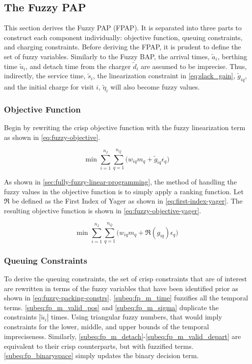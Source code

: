 \documentclass[ee,msthesis]{usuthesis}
\begin{document}
\subsection{The Fuzzy PAP}
\label{sec:the-fuzzy-pap}
This section derives the Fuzzy PAP (FPAP). It is separated into three parts to construct each component individually:
objective function, queuing constraints, and charging constraints. Before deriving the FPAP, it is prudent to define the
set of fuzzy variables. Similarly to the Fuzzy BAP, the arrival times, \(\tilde{a}_i\), berthing time \(\tilde{u}_i\), and
detach time from the charger \(\tilde{d}_i\) are assumed to be imprecise. Thus, indirectly, the service time,
\(\tilde{s}_i\), the linearization constraint in \ref{eq:slack_gain}, \(\tilde{g}_{iq}\), and the initial charge for visit
\(i\), \(\tilde{\eta}_i\) will also become fuzzy values.

\subsubsection{Objective Function}
\label{sec:orgd519e21}
Begin by rewriting the crisp objective function with the fuzzy linearization term as shown in \ref{eq:fuzzy-objective}.

\begin{equation}
\label{eq:fuzzy-objective}
\text{min } \sum_{i=1}^{n_I} \sum_{q=1}^{n_Q} \Big( w_{iq} m_q + \tilde{g}_{iq} \epsilon_{q} \Big)
\end{equation}

As shown in \ref{sec:fully-fuzzy-linear-programming}, the method of handling the fuzzy values in the objective function is to
simply apply a ranking function. Let \(\mathfrak{R}\) be defined as the First Index of Yager as shown in \ref{eq:first-index-yager}.
The resulting objective function is shown in \ref{eq:fuzzy-objective-yager}.

\begin{equation}
\label{eq:fuzzy-objective-yager}
\text{min } \sum_{i=1}^{n_I} \sum_{q=1}^{n_Q} \Big( w_{iq} m_q + \mathfrak{R}(g_{iq}) \epsilon_{q} \Big)
\end{equation}

\subsubsection{Queuing Constraints}
\label{sec:orge82956f}
To derive the queuing constraints, the set of crisp constraints that are of interest are rewritten in terms of the fuzzy
variables that have been identified prior as shown in \ref{eq:fuzzy-packing-constrs}. \ref{subeq:fp_m_time} fuzzifies all the
temporal terms. \ref{subeq:fp_m_valid_pos} and \ref{subeq:fp_m_sigma} duplicate the constraints \(|\tilde{u}_i|\) times.
Using triangular fuzzy numbers, that would imply constraints for the lower, middle, and upper bounds of the temporal
impreciseness. Similarly, \ref{subeq:fp_m_detach}-\ref{subeq:fp_m_valid_depart} are equivalent to their crisp
counterparts, but with fuzzified terms. \ref{subeq:fp_binaryspace} simply updates the binary decision term.
\end{document}

